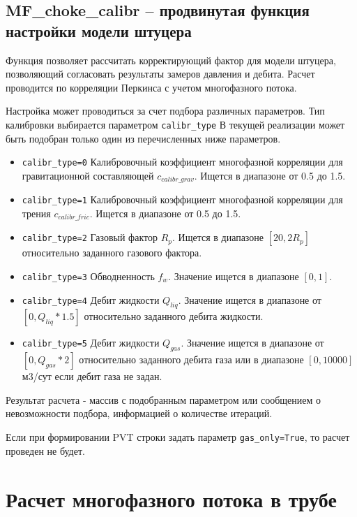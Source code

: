 \subsection{MF\_choke\_calibr – продвинутая функция настройки модели штуцера}
Функция позволяет рассчитать корректирующий фактор для модели штуцера, позволяющий согласовать результаты замеров давления и дебита. Расчет проводится по корреляции Перкинса \cite{Perkins_1993} с учетом многофазного потока.  

Настройка может проводиться за счет подбора различных параметров. Тип калибровки выбирается параметром \texttt{calibr_type} В текущей реализации может быть подобран только один из перечисленных ниже параметров.

\begin{itemize}
	\item \texttt{calibr_type=0} Калибровочный коэффициент многофазной корреляции для гравитационной составляющей  $c_{calibr\_grav}$. Ищется в диапазоне от 0.5 до 1.5.
	\item \texttt{calibr_type=1} Калибровочный коэффициент многофазной корреляции для трения $c_{calibr\_fric}$. Ищется в диапазоне от 0.5 до 1.5.
	\item \texttt{calibr_type=2} Газовый фактор $R_p$. Ищется в диапазоне $[20, 2 R_p]$ относительно заданного газового фактора. 
	\item \texttt{calibr_type=3} Обводненность $f_w$.  Значение ищется в диапазоне $[0, 1]$.  
	\item \texttt{calibr_type=4} Дебит жидкости \(Q_{liq}\). Значение ищется в диапазоне от \([0, Q_{liq}*1.5]\) относительно заданного дебита жидкости. 	 
	\item \texttt{calibr_type=5} Дебит жидкости \(Q_{gas}\). Значение ищется  в диапазоне от \([0, Q_{gas}*2]\) относительно заданного дебита газа или в диапазоне \([0,10000]\) м3/сут если дебит газа не задан. 	
\end{itemize}

Результат расчета - массив с подобранным параметром или сообщением о невозможности подбора, информацией о количестве итераций. 


Если при формировании PVT строки задать параметр \texttt{gas_only=True}, то расчет проведен не будет.

\newpage
\section{Расчет многофазного потока в трубе}


